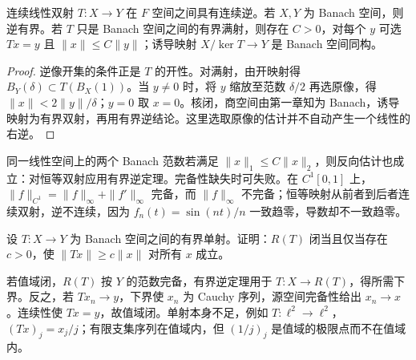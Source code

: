 \begin{corollary}[有界逆与商空间]\label{cor:y2-inverse}
连续线性双射 $T:X\to Y$ 在 $F$ 空间之间具有连续逆。若 $X,Y$ 为 Banach 空间，则逆有界。若 $T$ 只是 Banach 空间之间的有界满射，则存在 $C>0$，对每个 $y$ 可选 $Tx=y$ 且 $\|x\|\le C\|y\|$；诱导映射 $X/\ker T\to Y$ 是 Banach 空间同构。
\end{corollary}
\begin{proof}
逆像开集的条件正是 $T$ 的开性。对满射，由开映射得 $B_Y(\delta)\subset T(B_X(1))$。当 $y\ne0$ 时，将 $y$ 缩放至范数 $\delta/2$ 再选原像，得 $\|x\|<2\|y\|/\delta$；$y=0$ 取 $x=0$。核闭，商空间由第一章知为 Banach，诱导映射为有界双射，再用有界逆结论。这里选取原像的估计并不自动产生一个线性的右逆。
\end{proof}

\begin{example}[等价范数与不完备反例]
同一线性空间上的两个 Banach 范数若满足 $\|x\|_1\le C\|x\|_2$，则反向估计也成立：对恒等双射应用有界逆定理。完备性缺失时可失败。在 $C^1[0,1]$ 上，$\|f\|_{C^1}=\|f\|_\infty+\|f'\|_\infty$ 完备，而 $\|f\|_\infty$ 不完备；恒等映射从前者到后者连续双射，逆不连续，因为 $f_n(t)=\sin(nt)/n$ 一致趋零，导数却不一致趋零。
\end{example}

\begin{exercise}
设 $T:X\to Y$ 为 Banach 空间之间的有界单射。证明：$R(T)$ 闭当且仅当存在 $c>0$，使 $\|Tx\|\ge c\|x\|$ 对所有 $x$ 成立。
\end{exercise}
\begin{solution}
若值域闭，$R(T)$ 按 $Y$ 的范数完备，有界逆定理用于 $T:X\to R(T)$，得所需下界。反之，若 $Tx_n\to y$，下界使 $x_n$ 为 Cauchy 序列，源空间完备性给出 $x_n\to x$。连续性使 $Tx=y$，故值域闭。单射本身不足，例如 $T:\ell^2\to\ell^2$，$(Tx)_j=x_j/j$；有限支集序列在值域内，但 $(1/j)_j$ 是值域的极限点而不在值域内。
\end{solution}
